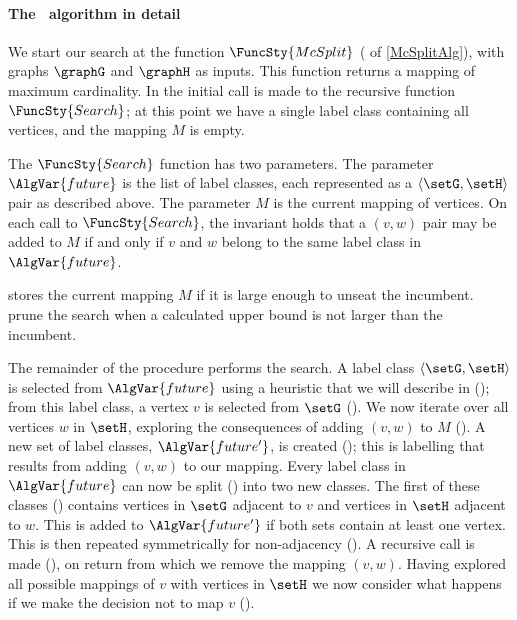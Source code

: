 \paragraph{The \McSplit\ algorithm in detail} We start our search at the function
$\FuncSty{McSplit}$ ( of \cref{McSplitAlg}),
with graphs $\graphG$ and $\graphH$ as inputs.  This function returns a mapping of
maximum cardinality.  In  the initial call is made to
the recursive function $\FuncSty{Search}$; at this point we have a single label class containing all
vertices, and the mapping $M$ is empty.

The
$\FuncSty{Search}$ function has two parameters.  The parameter $\AlgVar{future}$ is the
list of label classes, each represented as a $\langle \setG, \setH \rangle$ pair as
described above.  The parameter $M$ is the current mapping of vertices.  On
each call to $\FuncSty{Search}$, the invariant holds that a $(v,w)$ pair may be
added to $M$ if and only if $v$ and $w$ belong to the same label class in
$\AlgVar{future}$.

 stores the current mapping $M$ if it is large enough
to unseat the incumbent.   prune the
search when a calculated upper bound is not larger than the incumbent.

The remainder of the procedure performs the search.  A label class
$\langle \setG, \setH \rangle$ is selected from $\AlgVar{future}$
using a heuristic that we will describe in 
(); from this label class, a vertex $v$ is selected
from $\setG$ (). We now iterate over all
vertices $w$ in $\setH$, exploring the consequences of adding $(v,w)$ to $M$
().  A new set of label classes,
$\AlgVar{future'}$,
is created (); this is labelling that results
from adding $(v,w)$ to our mapping.  Every label class in $\AlgVar{future}$ can
now be split () into two new classes. The
first of these classes ()
contains vertices in $\setG$ adjacent to $v$ and vertices in $\setH$ adjacent to $w$.
This is added to $\AlgVar{future'}$ if both sets contain at least one vertex.
This is then repeated symmetrically for non-adjacency
(). A recursive call is made
(), on return from which we remove the mapping $(v,w)$.
Having explored all possible mappings of $v$ with vertices in $\setH$ we now
consider what happens if we make the decision not to map $v$
().

